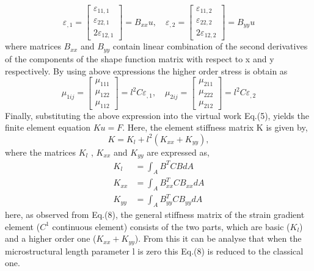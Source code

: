 \documentclass[12pt]{article}
\begin{document}
\[
\varepsilon_{,1}=
\begin{bmatrix}
\varepsilon_{11,1} \\
\varepsilon_{22,1} \\
2\varepsilon_{12,1} 
\end{bmatrix}
=B_{xx}u , \quad   
\varepsilon_{,2}=
\begin{bmatrix}
\varepsilon_{11,2} \\
\varepsilon_{22,2} \\
2\varepsilon_{12,2}
\end{bmatrix}
=B_{yy}u
\]
\newline
where matrices $ B_{xx} $ and $ B_{yy} $ contain linear combination of the second derivatives of the components of the shape function matrix with respect to x and y respectively. By using above expressions the higher order stress is obtain as
\[
\mu_{1ij}=
\begin{bmatrix}
\mu_{111} \\
\mu_{122} \\
\mu_{112} 
\end{bmatrix}
=l^2C\varepsilon_{,1} , \quad   
\mu_{2ij}=
\begin{bmatrix}
\mu_{211} \\
\mu_{222} \\
\mu_{212} 
\end{bmatrix}
=l^2C\varepsilon_{,2}
\]
\newline
Finally, substituting the above expression into the virtual work Eq.(5), yields the finite element equation $Ku = F$. Here, the element stiffness matrix K is given by,
\begin{equation}
K = K_l + l^2(K_{xx}+K_{yy}),
\end{equation}  
where the matrices $ K_l $ , $ K_{xx} $ and $ K_{yy} $ are expressed as,
\begin{equation}
\begin{aligned}
K_l &= \int_A B^TCBdA \\
K_{xx} &= \int_A B^T_{xx}CB_{xx}dA \\
K_{yy} &= \int_A B^T_{yy}CB_{yy}dA 
\end{aligned}
\end{equation}
here, as observed from Eq.(8), the general stiffness matrix of the strain gradient element ($C^1$ continuous element) consists of the two parts, which are basic ($K_l$) and a higher order one ($K_{xx}+K_{yy}$). From this it can be analyse that when the microstructural length parameter l is zero this Eq.(8) is reduced to the classical one.
\newline
\end{document}
